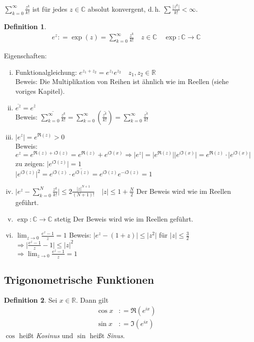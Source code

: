 \documentclass[ngerman,titlepage,twoside, parskip=half*]{scrreprt}
\newcommand*{\R}{\mathbb{R}}
\newcommand*{\C}{\mathbb{C}}
\theoremstyle{plain}
\theoremstyle{definition}
\newtheorem{definition}{Definition}
\theoremstyle{remark}
\newcommand*{\abs}[2][]{#1\lvert#2#1\rvert}
\newcommand*{\coloneqq}{\mathrel{\mathop:}=}
\begin{document}
$\sum_{k=0}^\infty \frac{z^k}{k!}$ ist für jedes $z\in\C$ absolut konvergent, d.\,h. $\sum \frac{\abs{z^k}}{k!}
<\infty$.
\begin{definition}
\begin{gather*}e^z\coloneqq\exp(z)=\sum_{k=0}^\infty \frac{z^k}{k!}\quad z\in\C\quad\exp\colon\C\rightarrow\C\end{gather*}
\end{definition}

Eigenschaften:
\begin{enumerate}[(i)]
  \item Funktionalgleichung: $e^{z_1+z_2}=e^{z_1}e^{z_2}\quad z_1,z_2\in\R$\\
    Beweis: Die Multiplikation von Reihen ist ähnlich wie im Reellen (siehe voriges Kapitel).
  \item $\overline{e^z}=e^{\overline{z}}$\\
    Beweis: $\overline{\sum_{k=0}^\infty \frac{z^k}{k!}}=\sum_{k=0}^\infty (\overline{\frac{z^k}{k!}})=
    \sum_{k=0}^\infty \frac{\overline{z^k}}{k!}$
  \item $\abs{e^z}=e^{\Re (z)}>0$\\
    Beweis: $e^z=e^{\Re (z)+i\Im (z)}=e^{\Re (z)}+e^{i\Im (x)}\Rightarrow \abs{e^z}=\abs{e^{\Re (z)}}\abs{e^{i\Im (x)}}
    =e^{\Re (z)}\cdot \abs{e^{i\Im (x)}}$\\
    zu zeigen: $\abs{e^{i\Im (z)}}=1$\\
    $\abs{e^{i\Im (z)}}^2=e^{i\Im (z)}\cdot \overline{e^{i\Im (z)}}=e^{i\Im (z)}e^{-i\Im (z)}=1$
  \item $\abs{e^z-\sum_{k=0}^N \frac{z^k}{k!}}\leq 2\frac{\abs{z}^{N+1}}{(N+1)!}\quad \abs{z}\leq 1+\frac{N}{2}$
    Der Beweis wird wie im Reellen geführt.
  \item $\exp\colon\C\rightarrow\C$ stetig
    Der Beweis wird wie im Reellen geführt.
  \item $\lim_{z\rightarrow 0}\frac{e^z-1}{z}=1$
    Beweis: $\abs{e^z-(1+z)}\leq \abs{z^2}$ für $\abs{z}\leq \frac{3}{2}$\\
    $\Rightarrow \abs{\frac{e^z-1}{z}-1}\leq \abs{z}^2$\\
    $\Rightarrow \lim_{z\rightarrow 0}\frac{{e^z}-1}{z}=1$
\end{enumerate}

\subsection{Trigonometrische Funktionen}
\begin{definition}
Sei $x\in\R$. Dann gilt
\begin{align*}
\cos x & \coloneqq \Re (e^{ix})\\
\sin x & \coloneqq \Im (e^{ix})
\end{align*}
$\cos$ heißt \emph{Kosinus} und $\sin$ heißt \emph{Sinus}.
\end{definition}
\end{document}
